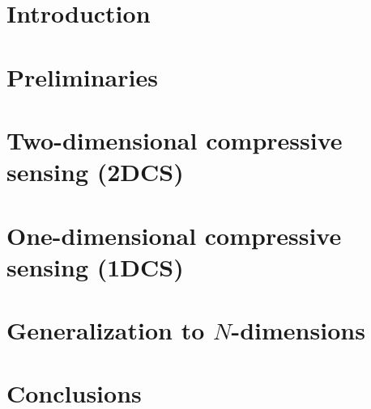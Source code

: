 \documentclass[12pt,oneside]{report}
\begin{document}
\tableofcontents
\listoffigures
\listoftables

\cleardoublepage
{}

\chapter{Introduction}
\label{chap:intro}


\chapter{Preliminaries}
\label{chap:theory}


\chapter{Two-dimensional compressive sensing (2DCS)}
\label{chap:2dcs}


\chapter{One-dimensional compressive sensing (1DCS)}
\label{chap:1dcs}

\chapter{Generalization to $N$-dimensions}
\label{chap:ndcs}

\chapter{Conclusions}
\label{chap:conc}



\end{document}
